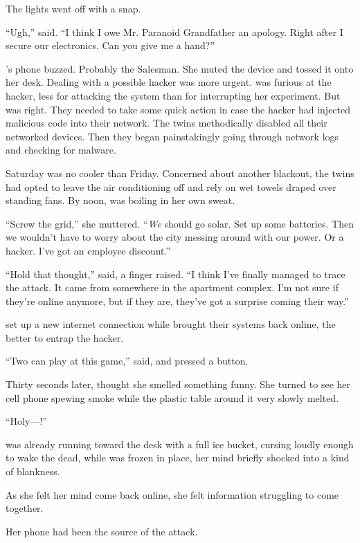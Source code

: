 The lights went off with a snap.

``Ugh,'' {\sidetag} said. ``I think I owe Mr. Paranoid Grandfather an apology. Right after I secure our electronics. Can you give me a hand?''

{\protag}'s phone buzzed. Probably the Salesman. She muted the device and tossed it onto her desk. Dealing with a possible hacker was more urgent. {\protag} was furious at the hacker, less for attacking the system than for interrupting her experiment. But {\sidetag} was right. They needed to take some quick action in case the hacker had injected malicious code into their network. The twins methodically disabled all their networked devices. Then they began painstakingly going through network logs and checking for malware.

Saturday was no cooler than Friday. Concerned about another blackout, the twins had opted to leave the air conditioning off and rely on wet towels draped over standing fans. By noon, {\protag} was boiling in her own sweat.

``Screw the grid,'' she muttered. ``\emph{We} should go solar. Set up some batteries. Then we wouldn't have to worry about the city messing around with our power. Or a hacker. I've got an employee discount.''

``Hold that thought,'' {\sidetag} said, a finger raised. ``I think I've finally managed to trace the attack. It came from somewhere in the apartment complex. I'm not sure if they're online anymore, but if they are, they've got a surprise coming their way.''

{\sidetag} set up a new internet connection while {\protag} brought their systems back online, the better to entrap the hacker.

``Two can play at this game,'' {\sidetag} said, and pressed a button.

Thirty seconds later, {\protag} thought she smelled something funny. She turned to see her cell phone spewing smoke while the plastic table around it very slowly melted.

``Holy---{\sidetag}!''

{\sidetag} was already running toward the desk with a full ice bucket, cursing loudly enough to wake the dead, while {\protag} was frozen in place, her mind briefly shocked into a kind of blankness.

As she felt her mind come back online, she felt information struggling to come together.

Her phone had been the source of the attack.

